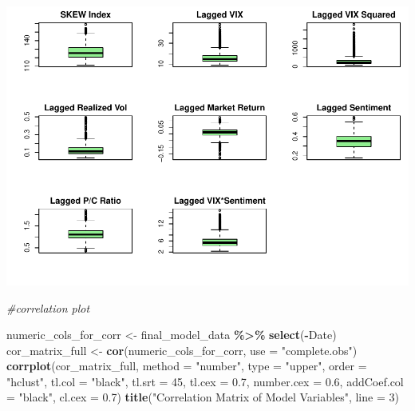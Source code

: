 \documentclass[
]{article}
\newenvironment{Shaded}{\begin{snugshade}}{\end{snugshade}}
\newcommand{\AttributeTok}[1]{\textcolor[rgb]{0.13,0.29,0.53}{#1}}
\newcommand{\CommentTok}[1]{\textcolor[rgb]{0.56,0.35,0.01}{\textit{#1}}}
\newcommand{\DecValTok}[1]{\textcolor[rgb]{0.00,0.00,0.81}{#1}}
\newcommand{\FloatTok}[1]{\textcolor[rgb]{0.00,0.00,0.81}{#1}}
\newcommand{\FunctionTok}[1]{\textcolor[rgb]{0.13,0.29,0.53}{\textbf{#1}}}
\newcommand{\NormalTok}[1]{#1}
\newcommand{\OtherTok}[1]{\textcolor[rgb]{0.56,0.35,0.01}{#1}}
\newcommand{\SpecialCharTok}[1]{\textcolor[rgb]{0.81,0.36,0.00}{\textbf{#1}}}
\newcommand{\StringTok}[1]{\textcolor[rgb]{0.31,0.60,0.02}{#1}}
\begin{document}
\includegraphics{FinalProject_files/figure-latex/exploratory-data-analysis-2.pdf}

\begin{Shaded}
\begin{Highlighting}[]
  \CommentTok{\#correlation plot}
  
\NormalTok{  numeric\_cols\_for\_corr }\OtherTok{\textless{}{-}}\NormalTok{ final\_model\_data }\SpecialCharTok{\%\textgreater{}\%} \FunctionTok{select}\NormalTok{(}\SpecialCharTok{{-}}\NormalTok{Date)}
\NormalTok{  cor\_matrix\_full }\OtherTok{\textless{}{-}} \FunctionTok{cor}\NormalTok{(numeric\_cols\_for\_corr, }\AttributeTok{use =} \StringTok{"complete.obs"}\NormalTok{)}
  \FunctionTok{corrplot}\NormalTok{(cor\_matrix\_full, }\AttributeTok{method =} \StringTok{"number"}\NormalTok{, }\AttributeTok{type =} \StringTok{"upper"}\NormalTok{, }\AttributeTok{order =} \StringTok{"hclust"}\NormalTok{, }
           \AttributeTok{tl.col =} \StringTok{"black"}\NormalTok{, }\AttributeTok{tl.srt =} \DecValTok{45}\NormalTok{, }\AttributeTok{tl.cex =} \FloatTok{0.7}\NormalTok{, }\AttributeTok{number.cex =} \FloatTok{0.6}\NormalTok{,}
           \AttributeTok{addCoef.col =} \StringTok{"black"}\NormalTok{,}
           \AttributeTok{cl.cex =} \FloatTok{0.7}\NormalTok{)}
  \FunctionTok{title}\NormalTok{(}\StringTok{"Correlation Matrix of Model Variables"}\NormalTok{, }\AttributeTok{line =} \DecValTok{3}\NormalTok{)}
\end{Highlighting}
\end{Shaded}
\end{document}
